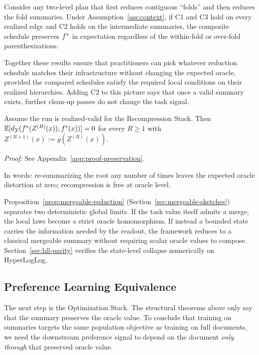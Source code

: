 \begin{corollary}\label{cor:folds}
Consider any two-level plan that first reduces contiguous ``folds'' and then reduces the fold summaries. Under Assumption~\ref{ass:context}, if C1 and C3 hold on every realized edge and C2 holds on the intermediate summaries, the composite schedule preserves $f^\ast$ in expectation regardless of the within-fold or over-fold parenthesizations.
\end{corollary}

Together these results ensure that practitioners can pick whatever reduction schedule matches their infrastructure without changing the expected oracle, provided the compared schedules satisfy the required local conditions on their realized hierarchies. Adding C2 to this picture says that once a valid summary exists, further clean-up passes do not change the task signal.

\begin{theorem}\label{thm:multi-round}
Assume the run is realized-valid for the Recompression Stack. Then $\mathbb{E}[d_{\mathcal{Y}}(f^\ast(Z^{(R)}(x)), f^\ast(x))] = 0$ for every $R \geq 1$ with $Z^{(R+1)}(x) := g(Z^{(R)}(x))$.
\end{theorem}

\noindent\textit{Proof:} See Appendix~\ref{app:proof-preservation}.

\noindent In words: re-summarizing the root any number of times leaves the expected oracle distortion at zero; recompression is free at oracle level.

Proposition~\ref{prop:mergeable-reduction} (Section~\ref{sec:mergeable-sketches}) separates two deterministic global limits. If the task value itself admits a merge, the local laws become a strict oracle homomorphism. If instead a bounded state carries the information needed by the readout, the framework reduces to a classical mergeable summary without requiring scalar oracle values to compose. Section~\ref{sec:hll-parity} verifies the state-level collapse numerically on HyperLogLog.

\subsection{Preference Learning Equivalence}

The next step is the Optimization Stack. The structural theorems above only say that the summary preserves the oracle value. To conclude that training on summaries targets the same population objective as training on full documents, we need the downstream preference signal to depend on the document \emph{only through} that preserved oracle value.

